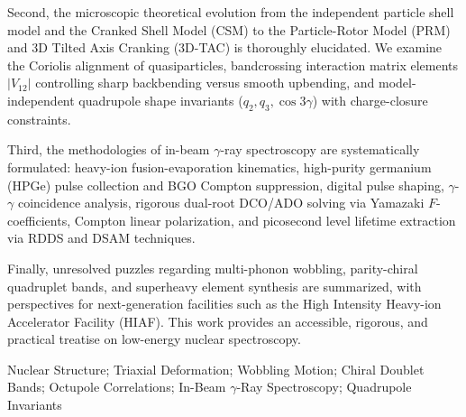 Second, the microscopic theoretical evolution from the independent particle shell model and the Cranked Shell Model (CSM) to the Particle-Rotor Model (PRM) and 3D Tilted Axis Cranking (3D-TAC) is thoroughly elucidated. We examine the Coriolis alignment of quasiparticles, bandcrossing interaction matrix elements $|V_{12}|$ controlling sharp backbending versus smooth upbending, and model-independent quadrupole shape invariants ($q_2, q_3, \cos 3\gamma$) with charge-closure constraints.

Third, the methodologies of in-beam $\gamma$-ray spectroscopy are systematically formulated: heavy-ion fusion-evaporation kinematics, high-purity germanium (HPGe) pulse collection and BGO Compton suppression, digital pulse shaping, $\gamma$-$\gamma$ coincidence analysis, rigorous dual-root DCO/ADO solving via Yamazaki $F$-coefficients, Compton linear polarization, and picosecond level lifetime extraction via RDDS and DSAM techniques.

Finally, unresolved puzzles regarding multi-phonon wobbling, parity-chiral quadruplet bands, and superheavy element synthesis are summarized, with perspectives for next-generation facilities such as the High Intensity Heavy-ion Accelerator Facility (HIAF). This work provides an accessible, rigorous, and practical treatise on low-energy nuclear spectroscopy.

\vspace{\baselineskip}
{\fontsize{12pt}{18pt}\selectfont Nuclear Structure; Triaxial Deformation; Wobbling Motion; Chiral Doublet Bands; Octupole Correlations; In-Beam $\gamma$-Ray Spectroscopy; Quadrupole Invariants}

